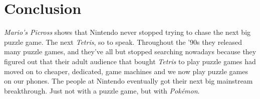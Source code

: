 \documentclass{book}
\begin{document}
\FloatBarrier\section*{Conclusion}
\emph{Mario’s Picross} shows that Nintendo never stopped trying to chase the next big puzzle game. The next \emph{Tetris}, so to speak. Throughout the ’90s they released many puzzle games, and they’ve all but stopped searching nowadays because they figured out that their adult audience that bought \emph{Tetris} to play puzzle games had moved on to cheaper, dedicated, game machines and we now play puzzle games on our phones. The people at Nintendo eventually got their next big mainstream breakthrough. Just not with a puzzle game, but with \emph{Pokémon}.\par
\FloatBarrier\vspace{\baselineskip}\begin{figure}[H]\end{figure}
\end{document}
